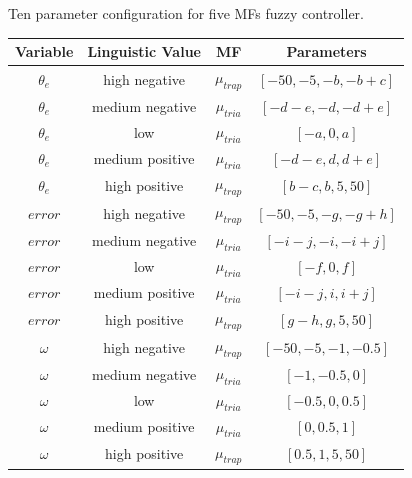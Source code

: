 \documentclass[symmetry,article,submit,moreauthors,pdftex]{Definitions/mdpi}
\begin{document}
\begin{specialtable}[htbp]
    \small
    \caption{Ten parameter configuration for five MFs fuzzy controller.}\label{tab:5mf}
    \begin{tabular}{cccc}
    \toprule
     \textbf{Variable} & \textbf{Linguistic Value} & \textbf{MF}& \textbf{Parameters}  \\
    \midrule
    $\theta_e$ & high negative  & $\mu_{trap}$  & $[-50, -5, -b, -b+c]$     \\ 
    $\theta_e$ & medium negative& $\mu_{tria}$  & $[-d-e, -d, -d+e]$     \\ 
    $\theta_e$ & low            & $\mu_{tria}$  & $[-a, 0, a]$     \\ 
    $\theta_e$ & medium positive& $\mu_{tria}$  & $[-d-e, d, d+e]$     \\ 
    $\theta_e$ & high positive  & $\mu_{trap}$  & $[b-c, b, 5, 50]$ \\

    \midrule
    $error$ & high negative  & $\mu_{trap}$  & $[-50, -5, -g, -g+h]$     \\ 
    $error$ & medium negative& $\mu_{tria}$  & $[-i-j, -i, -i+j]$     \\ 
    $error$ & low            & $\mu_{tria}$  & $[-f, 0, f]$     \\ 
    $error$ & medium positive& $\mu_{tria}$  & $[-i-j, i, i+j]$     \\ 
    $error$ & high positive  & $\mu_{trap}$  & $[g-h, g, 5, 50]$ \\

    \midrule
    $\omega$ & high negative  & $\mu_{trap}$  & $[-50, -5, -1, -0.5]$     \\ 
    $\omega$ & medium negative& $\mu_{tria}$  & $[-1, -0.5, 0]$     \\ 
    $\omega$ & low            & $\mu_{tria}$  & $[-0.5, 0, 0.5]$     \\ 
    $\omega$ & medium positive& $\mu_{tria}$  & $[0, 0.5,1]$     \\ 
    $\omega$ & high positive  & $\mu_{trap}$  & $[0.5, 1 ,5, 50]$     \\ 
    \bottomrule
\end{tabular}
\end{specialtable}
\end{document}
